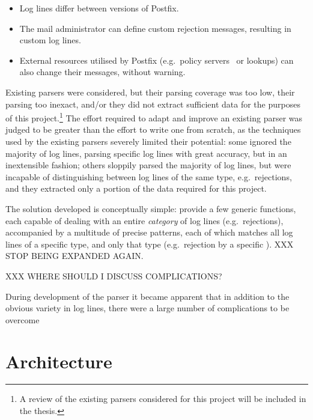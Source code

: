 \documentclass[]{svmult}
\begin{document}
\begin{itemize}

    \item Log lines differ between versions of Postfix.
        
    \item The mail administrator can define custom rejection messages,
        resulting in custom log lines.

    \item External resources utilised by Postfix (e.g.\ policy
        servers~\cite{policy-servers} or \RBL{} lookups) can also change
        their messages, without warning.

\end{itemize}

Existing parsers were considered, but their parsing coverage was too low,
their parsing too inexact, and/or they did not extract sufficient data for
the purposes of this project.\footnote{A review of the existing parsers
considered for this project will be included in the thesis.} The effort
required to adapt and improve an existing parser was judged to be greater
than the effort to write one from scratch, as the techniques used by the
existing parsers severely limited their potential: some ignored the
majority of log lines, parsing specific log lines with great accuracy, but
in an inextensible fashion; others sloppily parsed the majority of log
lines, but were incapable of distinguishing between log lines of the same
type, e.g.\ rejections, and they extracted only a portion of the data
required for this project.

The solution developed is conceptually simple: provide a few generic functions,
each capable of dealing with an entire \textit{category\/} of log lines (e.g.\
rejections), accompanied by a multitude of precise patterns, each of which
matches all log lines of a specific type, and only that type (e.g.\ rejection
by a specific \RBL{}).  XXX STOP \RBL{} BEING EXPANDED AGAIN\@.




XXX WHERE SHOULD I DISCUSS COMPLICATIONS\@?

During development of the parser it became apparent that in addition to the
obvious variety in log lines, there were a large number of complications to
be overcome

\section{Architecture}
\end{document}
